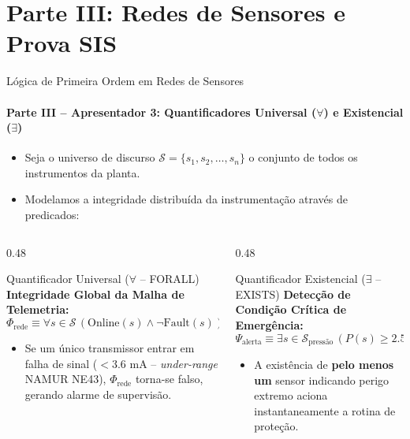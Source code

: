 \documentclass[aspectratio=169, 10pt]{beamer}
\begin{document}
\section{Parte III: Redes de Sensores e Prova SIS}

\begin{frame}{Lógica de Primeira Ordem em Redes de Sensores}
  \framesubtitle{Parte III -- Apresentador 3: Quantificadores Universal ($\forall$) e Existencial ($\exists$)}
  \begin{itemize}
    \item Seja o universo de discurso $\mathcal{S} = \{s_1, s_2, \dots, s_n\}$ o conjunto de todos os instrumentos da planta.
    \item Modelamos a integridade distribuída da instrumentação através de predicados:
  \end{itemize}

  \begin{columns}[t]
    \begin{column}{0.48\textwidth}
      \begin{block}{Quantificador Universal ($\forall$ -- FORALL)}
        \textbf{Integridade Global da Malha de Telemetria:}
        $$\Phi_{\text{rede}} \equiv \forall s \in \mathcal{S} \, (\text{Online}(s) \land \neg \text{Fault}(s))$$
        \begin{itemize}
          \item Se um único transmissor entrar em falha de sinal ($< 3.6\text{ mA}$ -- \textit{under-range} NAMUR NE43), $\Phi_{\text{rede}}$ torna-se falso, gerando alarme de supervisão.
        \end{itemize}
      \end{block}
    \end{column}

    \begin{column}{0.48\textwidth}
      \begin{alertblock}{Quantificador Existencial ($\exists$ -- EXISTS)}
        \textbf{Detecção de Condição Crítica de Emergência:}
        $$\Psi_{\text{alerta}} \equiv \exists s \in \mathcal{S}_{\text{pressão}} \, (P(s) \ge 2.5\text{ bar}) \lor \exists s \in \mathcal{S}_{\text{gás}} \, (G(s) \ge 20\text{ ppm})$$
        \begin{itemize}
          \item A existência de \textbf{pelo menos um} sensor indicando perigo extremo aciona instantaneamente a rotina de proteção.
        \end{itemize}
      \end{alertblock}
    \end{column}
  \end{columns}
\end{frame}
\end{document}
